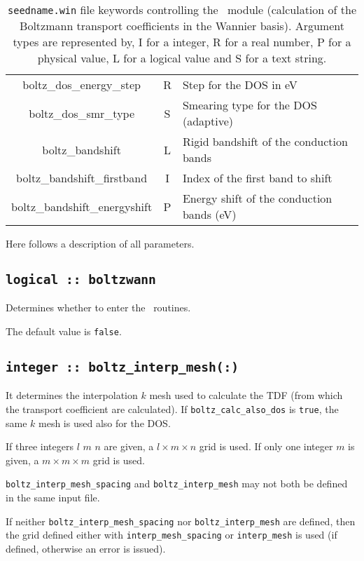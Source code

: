 \begin{table}
\begin{center}
\begin{tabular}{|c|c|p{6cm}|}
{\sc boltz\_dos\_energy\_step} & R & Step for the DOS in eV\\
{\sc boltz\_dos\_smr\_type} & S & Smearing type for the DOS (adaptive) \\
{\sc boltz\_bandshift} & L & Rigid bandshift of the conduction bands\\
{\sc boltz\_bandshift\_firstband} & I & Index of the first band to shift\\
{\sc boltz\_bandshift\_energyshift} & P & Energy shift of the conduction bands (eV)\\
\hline
\end{tabular}
\caption[Parameter file keywords controlling the \bw\ module.]
{{\tt seedname.win} file keywords controlling the \bw\ module (calculation of the Boltzmann transport coefficients in the Wannier basis). Argument types
are represented by, I for a integer, R for a real number, P for a
physical value, L for a logical value and S for a text string.}
\label{parameter_keywords_bw}
\end{center}
\end{table}

Here follows a description of all parameters.

\subsection[boltzwann]{\tt logical :: boltzwann}
Determines whether to enter the \bw\ routines.

The default value is \verb#false#.

\subsection[boltz\_interp\_mesh]{\tt integer :: boltz\_interp\_mesh(:)}
It determines the interpolation $k$ mesh used to calculate the TDF (from which the transport coefficient are calculated). If {\tt boltz\_calc\_also\_dos} is \verb#true#, the same $k$ mesh is used also for the DOS.

If three integers $l$ $m$ $n$ are given, a $l\times m\times n$ grid is used. If only one integer $m$ is given, a $m\times m\times m$ grid is used.

{\tt boltz\_interp\_mesh\_spacing} and  {\tt boltz\_interp\_mesh} may not both be defined in the same input file.

If neither {\tt boltz\_interp\_mesh\_spacing} nor  {\tt boltz\_interp\_mesh} are defined, then the grid defined either with {\tt interp\_mesh\_spacing} or {\tt interp\_mesh} is used (if defined, otherwise an error is issued).

